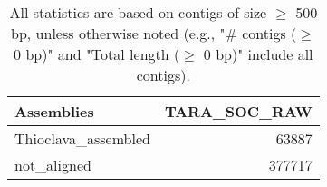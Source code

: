 \documentclass[12pt,a4paper]{article}
\begin{document}
\begin{table}[ht]
\begin{center}
\caption{All statistics are based on contigs of size $\geq$ 500 bp, unless otherwise noted (e.g., "\# contigs ($\geq$ 0 bp)" and "Total length ($\geq$ 0 bp)" include all contigs).}
\begin{tabular}{|l*{1}{|r}|}
\hline
Assemblies & TARA\_SOC\_RAW \\ \hline
Thioclava\_assembled & 63887 \\ \hline
not\_aligned & 377717 \\ \hline
\end{tabular}
\end{center}
\end{table}
\end{document}
